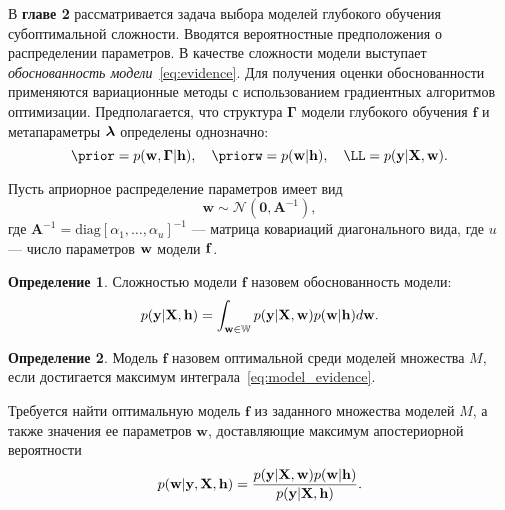 \documentclass[11pt, a5paper]{dissert}
\theoremstyle{definition}
\newtheorem{defin}{Определение}
\begin{document}
В \textbf{главе 2} рассматривается задача выбора моделей глубокого обучения субоптимальной сложности. Вводятся вероятностные предположения о распределении параметров. В качестве сложности модели выступает \textit{обоснованность модели}~\eqref{eq:evidence}. Для получения оценки обоснованности применяются вариационные методы с использованием градиентных алгоритмов оптимизации. 
Предполагается, что структура  $\boldsymbol{\Gamma}$  модели глубокого обучения $\mathbf{f}$  и метапараметры $\boldsymbol{\lambda}$ определены однозначно:
\begin{equation}
\label{eq:workaround}
    \prior = p(\w,\G|\h), \quad \priorw = p(\w|\h),\quad    \LL = p(\y|\X,\w).
\end{equation}


Пусть априорное распределение параметров имеет вид
\begin{equation}
\label{eq:prior}
	\mathbf{w} \sim \mathcal{N}(\mathbf{0}, \mathbf{A}^{-1}),
\end{equation}
где $\mathbf{A}^{-1} = \text{diag}[\alpha_1, \dots, \alpha_u]^{-1}$ --- матрица ковариаций диагонального вида, где $u$ --- число параметров $\mathbf{w}$ модели $\mathbf{f}$. 



\begin{defin} Сложностью модели $\mathbf{f}$ назовем обоснованность модели:
\begin{equation}
\label{eq:model_evidence}
	p(\mathbf{y}|\mathbf{X},\mathbf{h}) = \int_{\mathbf{w} \in \mathbb{W}} p(\mathbf{y}|\mathbf{X},\mathbf{w})p(\mathbf{w}|\mathbf{h})d\mathbf{w}.
\end{equation}
\end{defin}


\begin{defin}Модель  $\mathbf{f}$ назовем оптимальной среди моделей множества $M$, если достигается максимум интеграла~\eqref{eq:model_evidence}.
\end{defin}

Требуется найти оптимальную модель $\mathbf{f}$ из заданного множества моделей $M$, а также значения ее параметров $\mathbf{w}$, доставляющие максимум апостериорной вероятности
\begin{equation}
\label{eq:var_inf_posterior}
	p(\mathbf{w}|\mathbf{y},\mathbf{X},\mathbf{h}) = \frac{p(\mathbf{y}|\mathbf{X},\mathbf{w})p(\mathbf{w}|\mathbf{h})}{p(\mathbf{y}|\mathbf{X}, \mathbf{h})}.
\end{equation}

\end{document}
